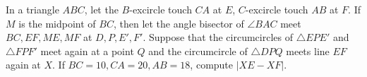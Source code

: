 In a triangle $ABC$, let the $B$-excircle touch $CA$ at $E$, $C$-excircle touch $AB$ at $F$. If $M$ is the midpoint of $BC$, then let the angle bisector of $\angle{BAC}$ meet $BC,EF,ME,MF$ at $D,P,E',F'$. Suppose that the circumcircles of $\triangle{EPE'}$ and $\triangle{FPF'}$ meet again at a point $Q$ and the circumcircle of $\triangle{DPQ}$ meets line $EF$ again at $X$. If $BC=10,CA=20,AB=18$, compute $\left|XE-XF\right|$.